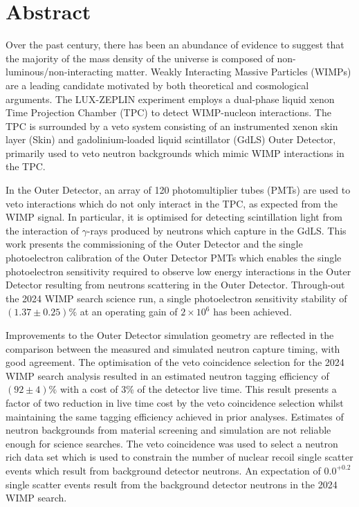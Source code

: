 \documentclass[a4paper,11pt,usegeometry]{scrreprt} %
\begin{document}
\doublespacing %
\chapter*{Abstract}
Over the past century, there has been an abundance of evidence to suggest that the majority of the mass density of the universe is composed of non-luminous/non-interacting matter. Weakly Interacting Massive Particles (WIMPs) are a leading candidate motivated by both theoretical and cosmological arguments. The LUX-ZEPLIN experiment employs a dual-phase liquid xenon Time Projection Chamber (TPC) to detect WIMP-nucleon interactions. The TPC is surrounded by a veto system consisting of an instrumented xenon skin layer (Skin) and gadolinium-loaded liquid scintillator (GdLS) Outer Detector, primarily used to veto neutron backgrounds which mimic WIMP interactions in the TPC.

In the Outer Detector, an array of 120 photomultiplier tubes (PMTs) are used to veto interactions which do not only interact in the TPC, as expected from the WIMP signal. In particular, it is optimised for detecting scintillation light from the interaction of $\gamma$-rays produced by neutrons which capture in the GdLS. This work presents the commissioning of the Outer Detector and the single photoelectron calibration of the Outer Detector PMTs which enables the single photoelectron sensitivity required to observe low energy interactions in the Outer Detector resulting from neutrons scattering in the Outer Detector. Through-out the 2024 WIMP search science run, a single photoelectron sensitivity stability of $(1.37\pm0.25)\%$ at an operating gain of $2\times10^6$ has been achieved.

Improvements to the Outer Detector simulation geometry are reflected in the comparison between the measured and simulated neutron capture timing, with good agreement. The optimisation of the veto coincidence selection for the 2024 WIMP search analysis resulted in an estimated neutron tagging efficiency of $(92\pm4)\%$ with a cost of 3\% of the detector live time. This result presents a factor of two reduction in live time cost by the veto coincidence selection whilst maintaining the same tagging efficiency achieved in prior analyses. Estimates of neutron backgrounds from material screening and simulation are not reliable enough for science searches. The veto coincidence was used to select a neutron rich data set which is used to constrain the number of nuclear recoil single scatter events which result from background detector neutrons. An expectation of $0.0^{+0.2}$ single scatter events result from the background detector neutrons in the 2024 WIMP search.
\end{document}
